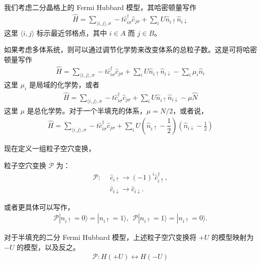 我们考虑二分晶格上的 Fermi Hubbard 模型，其哈密顿量写作
\begin{align}
    \hat{H} = \sum_{\langle i,j\rangle,\sigma} -t\hat{c}_{i\sigma}^{\dagger}\hat{c}_{j\sigma} + \sum_{i} U \hat{n}_{i\uparrow}\hat{n}_{i\downarrow} 
\end{align}
这里 $\langle i,j\rangle$ 标示最近邻格点，其中 $i\in A$ 而 $j\in B$。

如果考虑多体系统，则可以通过调节化学势来改变体系的总粒子数。这是可将哈密顿量写作
\begin{align}
    \hat{H} = \sum_{\langle i,j\rangle,\sigma} -t\hat{c}_{i\sigma}^{\dagger}\hat{c}_{j\sigma} + \sum_{i} U \hat{n}_{i\uparrow}\hat{n}_{i\downarrow} - \sum_i\mu_i\hat{n}_i
\end{align}
这里 $\mu_i$ 是局域的化学势，或者
\begin{align}
    \hat{H} = \sum_{\langle i,j\rangle,\sigma} -t\hat{c}_{i\sigma}^{\dagger}\hat{c}_{j\sigma} + \sum_{i} U \hat{n}_{i\uparrow}\hat{n}_{i\downarrow} -\mu\hat{N}
\end{align}
这里 $\mu$ 是总化学势。对于一个半填充的体系，$\mu=N/2$，或者说，
\begin{align}
    \hat{H} = \sum_{\langle i,j\rangle,\sigma} -t\hat{c}_{i\sigma}^{\dagger}\hat{c}_{j\sigma} + \sum_{i} U \left(\hat{n}_{i\uparrow}-\dfrac{1}{2}\right)\left(\hat{n}_{i\downarrow}-\frac{1}{2}\right) 
\end{align}

现在定义一组粒子空穴变换，
\begin{definition}
粒子空穴变换 $\mathcal{P}$ 为：
\begin{align}
    \mathcal{P} : \  \  
    & \hat{c}_{i\uparrow} \rightarrow (-1)^{i} \hat{c}_{i\uparrow}^{\dagger},  \nonumber\\
    & \hat{c}_{i\downarrow} \rightarrow \hat{c}_{i\downarrow}. 
\end{align}
\end{definition}
或者更具体可以写作，
\begin{align}
    \mathcal{P} |n_{i\uparrow} = 0\rangle = |n_{i\uparrow} = 1\rangle, \  \  
    \mathcal{P} |n_{i\uparrow} = 1\rangle = |n_{i\uparrow} = 0\rangle. 
\end{align}

\begin{lemma}\label{lemma1}
对于半填充的二分 Fermi Hubbard 模型，上述粒子空穴变换将 $+U$ 的模型映射为 $-U$ 的模型，以及反之。
\begin{align}
\mathcal{P}: H(+U) \leftrightarrow H(-U)
\end{align}
\end{lemma}

